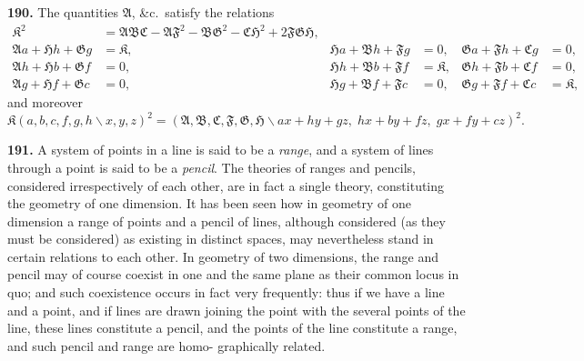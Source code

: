 \documentclass[11pt,a4paper]{article}
\begin{document}
\textbf{190.} The quantities $\mathfrak{A}$, \&c.\ satisfy the relations
\begin{align*}
\mathfrak{K}^2 &= \mathfrak{A}\mathfrak{B}\mathfrak{C} - \mathfrak{A}\mathfrak{F}^2 - \mathfrak{B}\mathfrak{G}^2 - \mathfrak{C}\mathfrak{H}^2 + 2\mathfrak{F}\mathfrak{G}\mathfrak{H},\\
\mathfrak{A}a+\mathfrak{H}h+\mathfrak{G}g &= \mathfrak{K}, & \mathfrak{H}a+\mathfrak{B}h+\mathfrak{F}g &= 0, & \mathfrak{G}a+\mathfrak{F}h+\mathfrak{C}g &= 0,\\
\mathfrak{A}h+\mathfrak{H}b+\mathfrak{G}f &= 0, & \mathfrak{H}h+\mathfrak{B}b+\mathfrak{F}f &= \mathfrak{K}, & \mathfrak{G}h+\mathfrak{F}b+\mathfrak{C}f &= 0,\\
\mathfrak{A}g+\mathfrak{H}f+\mathfrak{G}c &= 0, & \mathfrak{H}g+\mathfrak{B}f+\mathfrak{F}c &= 0, & \mathfrak{G}g+\mathfrak{F}f+\mathfrak{C}c &= \mathfrak{K},
\end{align*}
and moreover
\[
\mathfrak{K}(a,b,c,f,g,h\!\backslash x,y,z)^2 = (\mathfrak{A},\mathfrak{B},\mathfrak{C},\mathfrak{F},\mathfrak{G},\mathfrak{H}\!\backslash ax+hy+gz,\; hx+by+fz,\; gx+fy+cz)^2.
\]

\newpage
\textbf{191.} A system of points in a line is said to be a \textit{range}, and a system of
lines through a point is said to be a \textit{pencil}. The theories of ranges and pencils,
considered irrespectively of each other, are in fact a single theory, constituting the
geometry of one dimension. It has been seen how in geometry of one dimension a
range of points and a pencil of lines, although considered (as they must be considered)
as existing in distinct spaces, may nevertheless stand in certain relations to each other.
In geometry of two dimensions, the range and pencil may of course coexist in one
and the same plane as their common locus in quo; and such coexistence occurs in
fact very frequently: thus if we have a line and a point, and if lines are drawn
joining the point with the several points of the line, these lines constitute a pencil,
and the points of the line constitute a range, and such pencil and range are homo-
graphically related.
\end{document}
